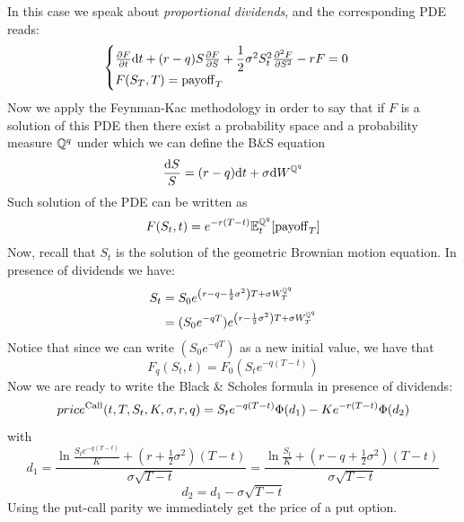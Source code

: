 In this case we speak about \emph{proportional dividends}, and the corresponding PDE reads:
\begin{equation}
    \begin{cases}
    \pdv{F}{t}\dd t + (r-q)S\pdv{F}{S} + \dfrac{1}{2}\sigma^2S_t^2\pdv[2]{F}{S} - rF = 0 \\
    F(S_T,T) = \operatorname{payoff}_T
    \end{cases}
\end{equation} 
Now we apply the Feynman-Kac methodology in order to say that if $F$ is a solution of this PDE then there exist a probability space and a probability measure $\mathbb{Q}^q$ under which we can define the B\&S equation
\begin{equation}
    \dfrac{\dd S}{S} = (r-q)\dd t + \sigma \dd W^{\mathbb{Q}^q} 
\end{equation}
Such solution of the PDE can be written as 
\begin{equation}
    F(S_t,t) = e^{-r(T-t)}\mathbb{E}^{\mathbb{Q}^q}_t[\operatorname{payoff}_T]
\end{equation}
Now, recall that $S_t$ is the solution of the geometric Brownian motion equation. In presence of dividends we have:
\begin{align}
    S_t &= S_0e^{\left(r-q-\frac{1}{2}\sigma^2\right)T+\sigma W_T^{\mathbb{Q}^q}} \\
    &=
    (S_0e^{-qT})e^{\left(r-\frac{1}{2}\sigma^2\right)T+\sigma W_T^{\mathbb{Q}^q}}
\end{align}
Notice that since we can write $(S_0e^{-qT})$ as a new initial value, we have that
\begin{equation}
    F_q(S_t,t) = F_0(S_te^{-q( T-t)})
\end{equation}
Now we are ready to write the Black \& Scholes formula in presence of dividends:
\begin{equation}
    price^{\operatorname{Call}}(t,T,S_t,K,\sigma,r,q) = S_te^{-q( T-t)}\Phi(d_1)-Ke^{-r(T-t)}\Phi(d_2)
\end{equation}
with 
\begin{equation}
    d_1 = \dfrac{\ln\frac{S_te^{-q(T-t)}}{K}+\left(r+\frac{1}{2}\sigma^2\right)(T-t)}{\sigma\sqrt{T-t}} = \dfrac{\ln\frac{S_t}{K}+\left(r-q+\frac{1}{2}\sigma^2\right)(T-t)}{\sigma\sqrt{T-t}}
\end{equation}
\begin{equation}
    d_2 = d_1 - \sigma\sqrt{T-t}
\end{equation}
Using the put-call parity we immediately get the price of a put option.